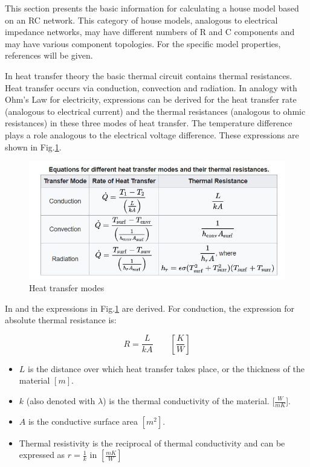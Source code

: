 This section presents the basic information for calculating a house model based on an RC network. This category of house models, analogous to electrical impedance networks, may have different numbers of R and C components and may have various component topologies. For the specific model properties, references will be given.

In heat transfer theory the basic thermal circuit contains thermal resistances. Heat transfer occurs via conduction, convection and radiation. In analogy with Ohm's Law for electricity, expressions can be derived for the heat transfer rate (analogous to electrical current) and the thermal resistances (analogous to ohmic resistances) in these three modes of heat transfer. The temperature difference plays a role analogous to the electrical voltage difference. These expressions are shown in Fig.\ref{table_1}.
\begin{figure}[H]
	\centering
	\includegraphics[width=0.8\columnwidth]{Pictures/heat transfer mode.JPG}
	\caption[Short title]{Heat transfer modes\cite{GIGO}}
	\label{table_1}
\end{figure}
\newpage

In \cite{HTTHERMO} and \cite{FUND} the expressions in Fig.\ref{table_1} are derived.
For conduction, the expression for absolute thermal resistance is:  

\begin{equation}
	R = \frac{L}{kA} \qquad \left[ \frac{K}{W} \right]
\end{equation}

\begin{itemize}
    \item $L$ is the distance over which heat transfer takes place, or the thickness of the material $[m]$.
    \item $k$ (also denoted with $\lambda$) is the thermal conductivity of the material. [$\frac{W}{mK}$]. 
    \item $A$ is the conductive surface area  $[m^2]$.
    \item Thermal resistivity is the reciprocal of thermal conductivity and can be expressed as $r =\frac{1}{k}$  in $[\frac{mK}{W}]$

\end{itemize}


